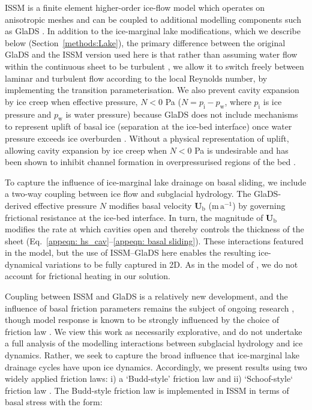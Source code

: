 \documentclass[tc, manuscript]{copernicus}
\begin{document}
ISSM is a finite element higher-order ice-flow model which operates on anisotropic meshes and can be coupled to additional modelling components such as GlaDS \citep{larour2012continental}. In addition to the ice-marginal lake modifications, which we describe below (Section~\ref{methods:Lake}), the primary difference between the original GlaDS \citep{werder2013modeling} and the ISSM version used here \citep{ehrenfeucht2023seasonal} is that rather than assuming water flow within the continuous sheet to be turbulent \citep[cf:][]{werder2013modeling}, we allow it to switch freely between laminar and turbulent flow according to the local Reynolds number, by implementing the \citet{hill2024improved} transition parameterisation. We also prevent cavity expansion by ice creep when effective pressure, $N < 0$ Pa ($N=p_{\mathrm{i}}-p_{\mathrm{w}}$, where $p_{\mathrm{i}}$ is ice pressure and $p_{\mathrm{w}}$ is water pressure) because GlaDS does not include mechanisms to represent uplift of basal ice (separation at the ice-bed interface) once water pressure exceeds ice overburden \citep[e.g.,][]{tsai2010model,schoof2012flotation,dow2015modeling}. Without a physical representation of uplift, allowing cavity expansion by ice creep when $N<0$ Pa is undesirable and has been shown to inhibit channel formation in overpressurised regions of the bed \citep{hill2024improved}.

To capture the influence of ice-marginal lake drainage on basal sliding, we include a two-way coupling between ice flow and subglacial hydrology. The GlaDS-derived effective pressure $N$ modifies basal velocity $\mathbf{U}_{\mathrm{b}}$ ($\mathrm{m}\, \mathrm{a}^{-1}$) by governing frictional resistance at the ice-bed interface. In turn, the magnitude of $\mathbf{U}_{\mathrm{b}}$ modifies the rate at which cavities open and thereby controls the thickness of the sheet (Eq.~\ref{appeqn: hs_cav}--\ref{appeqn: basal sliding}). These interactions featured in the \citet{kingslake2013modelling} model, but the use of ISSM--GlaDS here enables the resulting ice-dynamical variations to be fully captured in 2D. As in the model of \citet{kingslake2013modelling}, we do not account for frictional heating in our solution.

Coupling between ISSM and GlaDS is a relatively new development, and the influence of basal friction parameters remains the subject of ongoing research \citep[e.g.,][]{khan2024inland,McArthur2026impact}, though model response is known to be strongly influenced by the choice of friction law \citep{choi2023impact}. We view this work as necessarily explorative, and do not undertake a full analysis of the modelling interactions between subglacial hydrology and ice dynamics. Rather, we seek to capture the broad influence that ice-marginal lake drainage cycles have upon ice dynamics. Accordingly, we present results using two widely applied friction laws: i) a `Budd-style' friction law \citep{budd1984three} and ii) `Schoof-style` friction law \citep{schoof2005effect,gagliardini2007finite}. The Budd-style friction law is implemented in ISSM in terms of basal stress with the form:
\end{document}
